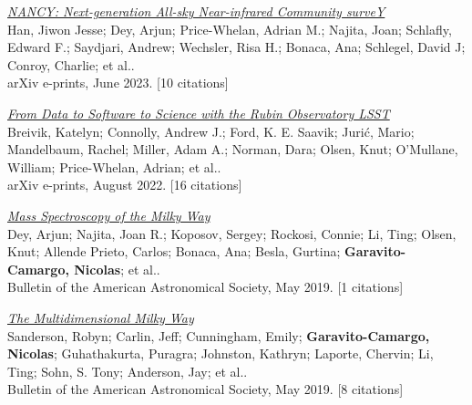 \documentclass[14pt]{article}
\begin{document}
\begin{etaremune}
\item \textit{\href{https://ui.adsabs.harvard.edu/abs/2023arXiv230611784H/abstract}{NANCY: Next-generation All-sky Near-infrared Community surveY}}\\
  {\small \color{darkgray} Han, Jiwon Jesse; Dey, Arjun; Price-Whelan, Adrian M.; Najita, Joan; Schlafly, Edward F.; Saydjari, Andrew; Wechsler, Risa H.; Bonaca, Ana; Schlegel, David J; Conroy, Charlie; et al..\\
  arXiv e-prints, June 2023. [10 citations]}

\item \textit{\href{https://ui.adsabs.harvard.edu/abs/2022arXiv220802781B/abstract}{From Data to Software to Science with the Rubin Observatory LSST}}\\
  {\small \color{darkgray} Breivik, Katelyn; Connolly, Andrew J.; Ford, K. E. Saavik; Jurić, Mario; Mandelbaum, Rachel; Miller, Adam A.; Norman, Dara; Olsen, Knut; O'Mullane, William; Price-Whelan, Adrian; et al..\\
  arXiv e-prints, August 2022. [16 citations]}

\item \textit{\href{https://ui.adsabs.harvard.edu/abs/2019BAAS...51c.489D/abstract}{Mass Spectroscopy of the Milky Way}}\\
  {\small \color{darkgray} Dey, Arjun; Najita, Joan R.; Koposov, Sergey; Rockosi, Connie; Li, Ting; Olsen, Knut; Allende Prieto, Carlos; Bonaca, Ana; Besla, Gurtina; \textbf{Garavito-Camargo, Nicolas}; et al..\\
  Bulletin of the American Astronomical Society, May 2019. [1 citations]}

\item \textit{\href{https://ui.adsabs.harvard.edu/abs/2019BAAS...51c.347S/abstract}{The Multidimensional Milky Way}}\\
  {\small \color{darkgray} Sanderson, Robyn; Carlin, Jeff; Cunningham, Emily; \textbf{Garavito-Camargo, Nicolas}; Guhathakurta, Puragra; Johnston, Kathryn; Laporte, Chervin; Li, Ting; Sohn, S. Tony; Anderson, Jay; et al..\\
  Bulletin of the American Astronomical Society, May 2019. [8 citations]}

\end{etaremune}
\end{document}
